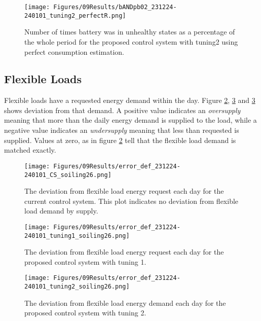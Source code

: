 \begin{figure}[h]
    \centering
    \texttt{[image: Figures/09Results/bANDpb02\_231224-240101\_tuning2\_perfectR.png]}
    \caption[Battery results proposed control system 2 perfect R]{Number of times battery was in unhealthy states as a percentage of the whole period for the proposed control system with tuning2 using perfect consumption estimation. }
    \label{fig:bANDpb02_231224-240101_tuning2_perfectR}
\end{figure}

\subsection{Flexible Loads}

Flexible loads have a requested energy demand within the day. Figure \ref{fig:error_def_231224-240101_CS_soiling26}, \ref{fig:error_def_231224-240101_tuning1_soiling26} and \ref{fig:error_def_231224-240101_tuning1_soiling26} shows deviation from that demand. A positive value indicates an \textit{oversupply} meaning that more than the daily energy demand is supplied to the load, while a negative value indicates an \textit{undersupply} meaning that less than requested is supplied. Values at zero, as in figure \ref{fig:error_def_231224-240101_CS_soiling26} tell that the flexible load demand is matched exactly.

\begin{figure}[h]
    \centering
    \texttt{[image: Figures/09Results/error\_def\_231224-240101\_CS\_soiling26.png]}
    \caption[Flexible load deviation current control system]{The deviation from flexible load energy request each day for the current control system. This plot indicates no deviation from flexible load demand by supply. }
    \label{fig:error_def_231224-240101_CS_soiling26}
\end{figure}

\begin{figure}[h]
    \centering
    \texttt{[image: Figures/09Results/error\_def\_231224-240101\_tuning1\_soiling26.png]}
    \caption[Flexible load deviation proposed control system 1]{The deviation from flexible load energy request each day for the proposed control system with tuning 1. }
    \label{fig:error_def_231224-240101_tuning1_soiling26}
\end{figure}

\begin{figure}[h]
    \centering
    \texttt{[image: Figures/09Results/error\_def\_231224-240101\_tuning2\_soiling26.png]}
    \caption[Flexible load deviation proposed control system 2]{The deviation from flexible load energy demand each day for the proposed control system with tuning 2. }
    \label{fig:error_def_231224-240101_tuning2_soiling26}
\end{figure}


